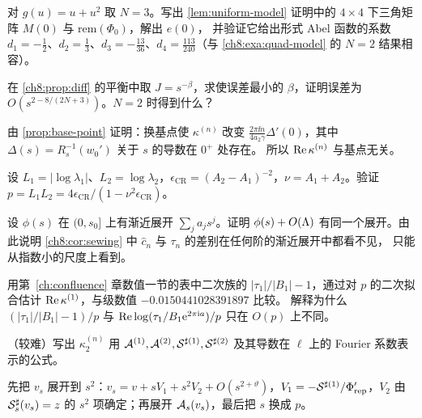 \begin{exercise}\label{ch8:ex:N2}
对 $g(u)=u+u^2$ 取 $N=3$。写出 \cref{lem:uniform-model} 证明中的 $4\times4$ 下三角矩阵 $M(0)$ 与 $\mathrm{rem}(\Phi_0)$，解出 $e(0)$，
并验证它给出形式 Abel 函数的系数 $d_1=-\frac12$、$d_2=\frac13$、$d_3=-\frac{13}{36}$、$d_4=\frac{113}{240}$（与 \cref{ch8:exa:quad-model} 的 $N=2$ 结果相容）。
\end{exercise}

\begin{exercise}\label{ch8:ex:exponent}
在 \cref{ch8:prop:diff} 的平衡中取 $J=s^{-\beta}$，求使误差最小的 $\beta$，证明误差为 $O(s^{2-8/(2N+3)})$。$N=2$ 时得到什么？
\end{exercise}

\begin{exercise}\label{ch8:ex:base}
由 \cref{prop:base-point} 证明：换基点使 $\kappa^{(n)}$ 改变 $\frac{2\pi\ii n}{4a_2\gamma}\Delta'(0)$，其中 $\Delta(s)=R_s^{-1}(w_0')$ 关于 $s$ 的导数在 $0^+$ 处存在。
所以 $\operatorname{Re}\kappa^{(n)}$ 与基点无关。
\end{exercise}

\begin{exercise}\label{ch8:ex:CR}
设 $L_1=|\log\lambda_1|$、$L_2=\log\lambda_2$，$\epsilon_{\mathrm{CR}}=(A_2-A_1)^{-2}$，$\nu=A_1+A_2$。验证 $p=L_1L_2=4\epsilon_{\mathrm{CR}}/(1-\nu^2\epsilon_{\mathrm{CR}})$。
\end{exercise}

\begin{exercise}\label{ch8:ex:beyond}
设 $\phi(s)$ 在 $(0,s_0]$ 上有渐近展开 $\sum_ja_js^j$。证明 $\phi(s)+O(\Lambda)$ 有同一个展开。由此说明 \cref{ch8:cor:sewing} 中 $\hat c_n$ 与 $\tau_n$ 的差别在任何阶的渐近展开中都看不见，
只能从指数小的尺度上看到。
\end{exercise}

\begin{exercise}\label{ch8:ex:fit}
用第~\ref{ch:confluence} 章数值一节的表中二次族的 $|\tau_1|/|B_1|-1$，通过对 $p$ 的二次拟合估计 $\operatorname{Re}\kappa^{(1)}$，与级数值 $-0.0150441028391897$ 比较。
解释为什么 $(|\tau_1|/|B_1|-1)/p$ 与 $\operatorname{Re}\log(\tau_1/B_1\mathrm{e}^{2\pi\mathrm{i} a})/p$ 只在 $O(p)$ 上不同。
\end{exercise}

\begin{exercise}\label{ch8:ex:second}
（较难）写出 $\kappa^{(n)}_2$ 用 $\mathcal A^{(1)},\mathcal A^{(2)},\mathcal S^{\sharp(1)},\mathcal S^{\sharp(2)}$ 及其导数在 $\ell$ 上的 Fourier 系数表示的公式。
\end{exercise}
\begin{hint}
先把 $v_s$ 展开到 $s^2$：$v_s=v+sV_1+s^2V_2+O(s^{2+\vartheta})$，$V_1=-\mathcal S^{\sharp(1)}/\Phi_{\mathrm{rep}}'$，$V_2$ 由 $\mathcal S^\sharp_s(v_s)=z$ 的 $s^2$ 项确定；再展开 $\mathcal A_s(v_s)$，最后把 $s$ 换成 $p$。
\end{hint}
